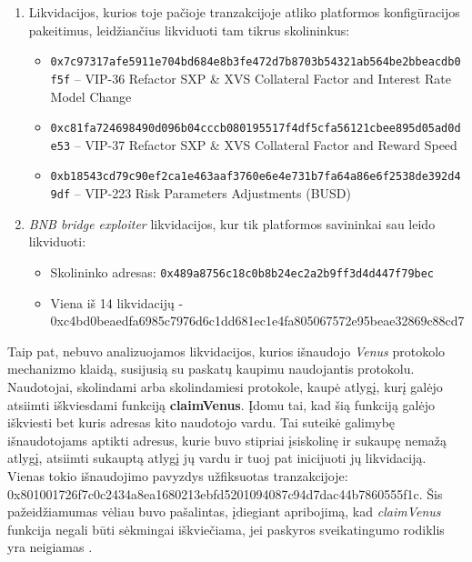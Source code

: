\documentclass{VUMIFPSkursinis}
\begin{document}
\begin{enumerate}
    \item Likvidacijos, kurios toje pačioje tranzakcijoje atliko platformos konfigūracijos pakeitimus, leidžiančius likviduoti tam tikrus skolininkus:
    \begin{itemize}
        \item \texttt{0x7c97317afe5911e704bd684e8b3fe472d7b8703b54321ab564be2bbeacdb0f5f} – VIP-36 Refactor SXP \& XVS Collateral Factor and Interest Rate Model Change
        \item \texttt{0xc81fa724698490d096b04cccb080195517f4df5cfa56121cbee895d05ad0de53} – VIP-37 Refactor SXP \& XVS Collateral Factor and Reward Speed
        \item \texttt{0xb18543cd79c90ef2ca1e463aaf3760e6e4e731b7fa64a86e6f2538de392d49df} – VIP-223 Risk Parameters Adjustments (BUSD)
    \end{itemize}
    \item \textit{BNB bridge exploiter} likvidacijos, kur tik platformos savininkai sau leido likviduoti:
    \begin{itemize}
        \item Skolininko adresas: \texttt{0x489a8756c18c0b8b24ec2a2b9ff3d4d447f79bec}
        \item Viena iš 14 likvidacijų - \\0xc4bd0beaedfa6985c7976d6c1dd681ec1e4fa805067572e95beae32869c88cd7
    \end{itemize}
\end{enumerate}

Taip pat, nebuvo analizuojamos likvidacijos, kurios išnaudojo \textit{Venus} protokolo mechanizmo klaidą, susijusią su paskatų kaupimu naudojantis protokolu. Naudotojai, skolindami arba skolindamiesi protokole, kaupė atlygį, kurį galėjo atsiimti iškviesdami funkciją \textbf{claimVenus}. Įdomu tai, kad šią funkciją galėjo iškviesti bet kuris adresas kito naudotojo vardu. Tai suteikė galimybę išnaudotojams aptikti adresus, kurie buvo stipriai įsiskolinę ir sukaupę nemažą atlygį, atsiimti sukauptą atlygį jų vardu ir tuoj pat inicijuoti jų likvidaciją. Vienas tokio išnaudojimo pavyzdys užfiksuotas tranzakcijoje: 0x801001726f7c0c2434a8ea1680213ebfd5201094087c94d7dac44b7860555f1c. Šis pažeidžiamumas vėliau buvo pašalintas, įdiegiant apribojimą, kad \textit{claimVenus} funkcija negali būti sėkmingai iškviečiama, jei paskyros sveikatingumo rodiklis yra neigiamas \cite{exploitFix}.

\end{document}
